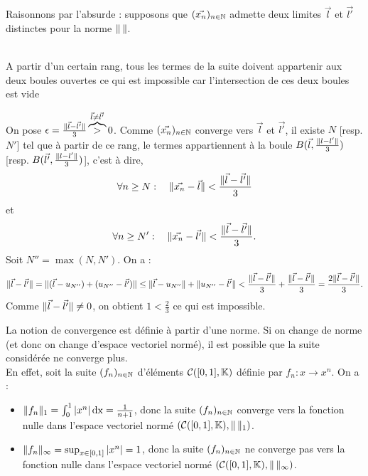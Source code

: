 \documentclass{book}
\begin{document}
\begin{Demonstration}
Raisonnons par l'absurde : supposons que $(\vec{x_n})_{n\in\mathbb{N}}$ admette deux limites $\vec{l}$ et $\vec{l'}$ distinctes pour la norme $\mathopen\lVert \, \mathclose\rVert$.\\
\begin{center}
\\
A partir d'un certain rang, tous les termes de la suite doivent appartenir aux deux boules ouvertes ce qui est impossible car l'intersection de ces deux boules est vide
\end{center}
On pose $\epsilon=\frac{\mathopen\lVert \vec{l}-\vec{l'} \mathclose\rVert}{3}\overbrace{>}^{\vec{l}\neq \vec{l'}}0$. Comme $(\vec{x_n})_{n\in\mathbb{N}}$ converge vers $\vec{l}$ et $\vec{l'}$, il existe $N$ [resp. $N'$] tel que à partir de ce rang, le termes appartiennent à la boule $B(\vec{l},\frac{\mathopen\lVert l-l' \mathclose\rVert}{3})$ [resp. $B(\vec{l'},\frac{\mathopen\lVert l-l' \mathclose\rVert}{3})$], c'est à dire,
$$\forall n \geq N:\quad  \mathopen\lVert \vec{x_n} - \vec{l} \mathclose\rVert <  \frac{\mathopen\lVert \vec{l}-\vec{l'} \mathclose\rVert}{3}$$
et  
$$\forall n \geq N':\quad \mathopen\lVert \vec{x_n} - \vec{l'} \mathclose\rVert <  \frac{\mathopen\lVert \vec{l}-\vec{l'} \mathclose\rVert}{3}.$$
Soit $N''=\max(N,N')$. On a :
$$\mathopen\lVert \vec{l} - \vec{l'} \mathclose\rVert=\mathopen\lVert (\vec{l} - u_{N''})+ (u_{N''}- \vec{l'}) \mathclose\rVert\leq \mathopen\lVert \vec{l} - u_{N''} \mathclose\rVert+ \mathopen\lVert u_{N''}- \vec{l'} \mathclose\rVert< \frac{\mathopen\lVert \vec{l}-\vec{l'} \mathclose\rVert}{3}+\frac{\mathopen\lVert \vec{l}-\vec{l'} \mathclose\rVert}{3}=\frac{2\mathopen\lVert \vec{l}-\vec{l'} \mathclose\rVert}{3}.$$ 
Comme $\mathopen\lVert \vec{l}-\vec{l'} \mathclose\rVert \neq 0$, on obtient $1< \frac{2}{3}$ ce qui est impossible.
\end{Demonstration}
\begin{Remarque}
La notion de convergence est définie à partir d'une norme. Si on change de norme (et donc on change d'espace vectoriel
normé), il est possible que la suite considérée ne converge plus.\\
En effet, soit la suite $(f_n)_{n\in\mathbb{N}}$ d'éléments $\mathcal{C}([0,1],\mathbb{K})$ définie par $f_n:x\to x^n.$
On a :
\begin{itemize}
\item $\mathopen\lVert f_n \mathclose\rVert_{1}=\int_0^1  |x^n|\,\mathrm{dx}=\frac{1}{n+1}$, donc la suite  $(f_n)_{n\in\mathbb{N}}$ converge vers la fonction nulle dans l'espace vectoriel normé $(\mathcal{C}([0,1],\mathbb{K}), \mathopen\lVert \, \mathclose\rVert_{1})$.
\item $\mathopen\lVert f_n \mathclose\rVert_{\infty}=\sup_{x\in[0,1]}|x^n|=1$, donc la suite  $(f_n)_{n\in\mathbb{N}}$ ne converge pas vers la fonction nulle dans l'espace vectoriel normé $(\mathcal{C}([0,1],\mathbb{K}), \mathopen\lVert \, \mathclose\rVert_{\infty})$.
\end{itemize}
\end{Remarque}
\end{document}
